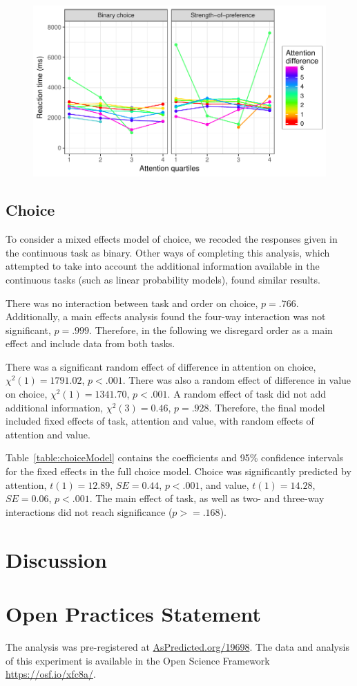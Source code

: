 \documentclass[12pt]{article}
\begin{document}
\begin{figure}
	\centering
	\includegraphics{images/RTattentionValueGraph}
	\caption{}
	\label{figure:RTattentionValueGraph}
\end{figure}

\subsection{Choice}
To consider a mixed effects model of choice, we recoded the responses given in the continuous task as binary. Other ways of completing this analysis, which attempted to take into account the additional information available in the continuous tasks (such as linear probability models), found similar results. 

There was no interaction between task and order on choice, $p=.766$. Additionally, a main effects analysis found the four-way interaction was not significant, $p=.999$. Therefore, in the following we disregard order as a main effect and include data from both tasks. 

There was a significant random effect of difference in attention on choice, $\chi^2(1)=1791.02$, $p<.001$. There was also a random effect of difference in value on choice, $\chi^2(1)=1341.70$, $p<.001$. A random effect of task did not add additional information, $\chi^2(3)=0.46$, $p=.928$. Therefore, the final model included fixed effects of task, attention and value, with random effects of attention and value.

 

Table~\ref{table:choiceModel} contains the coefficients and 95\% confidence intervals for the fixed effects in the full choice model. Choice was significantly predicted by attention, $t(1)=12.89$, $SE=0.44$, $p<.001$, and value, $t(1)=14.28$, $SE=0.06$, $p<.001$. The main effect of task, as well as two- and three-way interactions did not reach significance ($p>=.168$).

\section{Discussion}

\section{Open Practices Statement}
The analysis was pre-registered at \url{AsPredicted.org/19698}. The data and analysis of this experiment is available in the Open Science Framework \url{https://osf.io/xfc8a/}. 


\newpage


\end{document}
